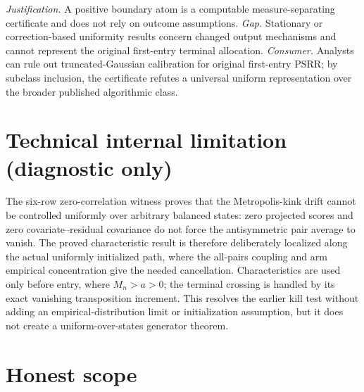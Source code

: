\documentclass{article}
\begin{document}
\par\smallskip\noindent \textit{Justification.} A positive boundary atom is a computable measure-separating certificate and does not rely on outcome assumptions. \textit{Gap.} Stationary or correction-based uniformity results concern changed output mechanisms and cannot represent the original first-entry terminal allocation. \textit{Consumer.} Analysts can rule out truncated-Gaussian calibration for original first-entry PSRR; by subclass inclusion, the certificate refutes a universal uniform representation over the broader published algorithmic class.

\section*{Technical internal limitation (diagnostic only)}

The six-row zero-correlation witness proves that the Metropolis-kink drift cannot be controlled uniformly over arbitrary balanced states: zero projected scores and zero covariate--residual covariance do not force the antisymmetric pair average to vanish. The proved characteristic result is therefore deliberately localized along the actual uniformly initialized path, where the all-pairs coupling and arm empirical concentration give the needed cancellation. Characteristics are used only before entry, where \(M_n>a>0\); the terminal crossing is handled by its exact vanishing transposition increment. This resolves the earlier kill test without adding an empirical-distribution limit or initialization assumption, but it does not create a uniform-over-states generator theorem.

\section{Honest scope}
\end{document}
